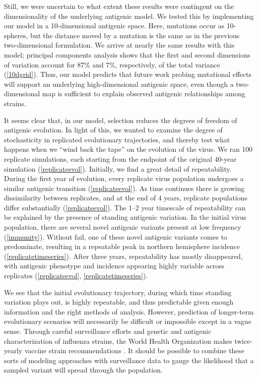 Still, we were uncertain to what extent these results were contingent on the dimensionality of the underlying antigenic model.  We tested this by implementing our model in a 10-dimensional antigenic space.  Here, mutations occur as 10-spheres, but the distance moved by a mutation is the same as in the previous two-dimensional formulation.  We arrive at nearly the same results with this model; principal components analysis shows that the first and second dimensions of variation account for 87\% and 7\%, respectively, of the total variance (\ref{10dgrid}).  Thus, our model predicts that future work probing mutational effects will support an underlying high-dimensional antigenic space, even though a two-dimensional map is sufficient to explain observed antigenic relationships among strains.

It seems clear that, in our model, selection reduces the degrees of freedom of antigenic evolution.  In light of this, we wanted to examine the degree of stochasticity in replicated evolutionary trajectories, and thereby test what happens when we ``wind back the tape'' \cite{GouldWonderfulLife} on the evolution of the virus.  We ran 100 replicate simulations, each starting from the endpoint of the original 40-year simulation (\ref{replicateevol}).  Initially, we find a great detail of repeatability.  During the first year of evolution, every replicate virus population undergoes a similar antigenic transition (\ref{replicateevol}).  As time continues there is growing dissimilarity between replicates, and at the end of 4 years, replicate populations differ substantially (\ref{replicateevol}).  The 1--2 year timescale of repeatability can be explained by the presence of standing antigenic variation.  In the initial virus population, there are several novel antigenic variants present at low frequency (\ref{immunity}).  Without fail, one of these novel antigenic variants comes to predominate, resulting in a repeatable peak in northern hemisphere incidence (\ref{replicatetimeseries}).  After three years, repeatability has mostly disappeared, with antigenic phenotype and incidence appearing highly variable across replicates (\ref{replicateevol}, \ref{replicatetimeseries}).

We see that the initial evolutionary trajectory, during which time standing variation plays out, is highly repeatable, and thus predictable given enough information and the right methods of analysis.  However, prediction of longer-term evolutionary scenarios will necessarily be difficult or impossible except in a vague sense.  Through careful surveillance efforts and genetic and antigenic characterization of influenza strains, the World Health Organization makes twice-yearly vaccine strain recommendations \cite{Barr10}.  It should be possible to combine these sorts of modeling approaches with surveillance data to gauge the likelihood that a sampled variant will spread through the population.

